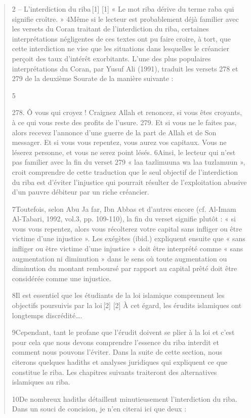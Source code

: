 \begin{quote}
2 – L’interdiction du riba [1]
[1]
« Le mot riba dérive du terme raba qui signifie croître. »
4Même si le lecteur est probablement déjà familier avec les versets du Coran traitant de l’interdiction du riba, certaines interprétations négligentes de ces textes ont pu faire croire, à tort, que cette interdiction ne vise que les situations dans lesquelles le créancier perçoit des taux d’intérêt exorbitants. L’une des plus populaires interprétations du Coran, par Yusuf Ali (1991), traduit les versets 278 et 279 de la deuxième Sourate de la manière suivante :

5

278. Ô vous qui croyez ! Craignez Allah et renoncez, si vous êtes croyants, à ce qui vous reste des profits de l’usure.
279. Et si vous ne le faites pas, alors recevez l’annonce d’une guerre de la part de Allah et de Son messager. Et si vous vous repentez, vous aurez vos capitaux. Vous ne léserez personne, et vous ne serez point lésés.
6Ainsi, le lecteur qui n’est pas familier avec la fin du verset 279 « laa tazlimuuna wa laa tuzlamuun », croit comprendre de cette traduction que le seul objectif de l’interdiction du riba est d’éviter l’injustice qui pourrait résulter de l’exploitation abusive d’un pauvre débiteur par un riche créancier.

7Toutefois, selon Abu Ja far, Ibn Abbas et d’autres encore (cf. Al-Imam Al-Tabari, 1992, vol.3, pp. 109-110), la fin du verset signifie plutôt : « si vous vous repentez, alors vous récolterez votre capital sans infliger ou être victime d’une injustice ». Les exégètes (ibid.) expliquent ensuite que « sans infliger ou être victime d’une injustice » doit être interprété comme « sans augmentation ni diminution » dans le sens où toute augmentation ou diminution du montant remboursé par rapport au capital prêté doit être considérée comme une injustice.

8Il est essentiel que les étudiants de la loi islamique comprennent les objectifs poursuivis par la loi [2]
[2]
À cet égard, les érudits islamiques ont longtemps discrédité….

9Cependant, tant le profane que l’érudit doivent se plier à la loi et c’est pour cela que nous devons comprendre l’essence du riba interdit et comment nous pouvons l’éviter. Dans la suite de cette section, nous citerons quelques hadiths et analyses juridiques qui expliquent ce que constitue le riba. Les chapitres suivants traiteront des alternatives islamiques au riba.

10De nombreux hadiths détaillent minutieusement l’interdiction du riba. Dans un souci de concision, je n’en citerai ici que deux :


\end{quote}
